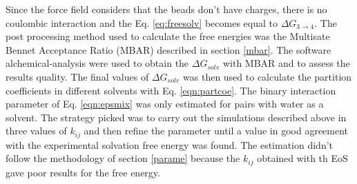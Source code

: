 Since the force field considers that the beads don't have charges, there is no coulombic interaction and the Eq. \eqref{eq:freesolv} becomes equal to $\Delta G_{3 \rightarrow 4} $. The post processing method used to calculate the free energies was the Multisate Bennet Acceptance Ratio (MBAR) described in section \ref{mbar}. The software alchemical-analysis \cite{klimovich} were used to obtain the $\Delta G_{solv}$ with MBAR and to assess the results quality. The final values of $\Delta G_{solv}$ was then used to calculate the partition coefficients in different solvents with Eq. \eqref{eqn:partcoe}. The binary interaction  parameter of Eq. \eqref{eqn:epsmix} was only estimated for pairs with water as a solvent. The strategy picked was to carry out the simulations described above in three values of $k_{ij}$ and then refine the parameter until a value in good agreement with the experimental solvation free energy was found. The estimation didn't follow the methodology of section \ref{parame} because the $k_{ij}$ obtained with th EoS gave poor results for the free energy.



